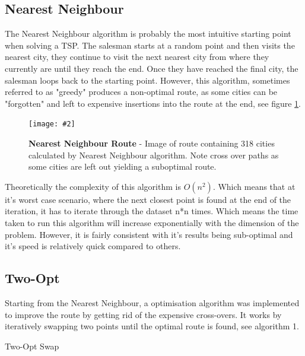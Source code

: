 \documentclass[10pt, a4paper]{article}
\newcommand{\figuremacro}[5]{
    \begin{figure}[#1]
        \centering
        \texttt{[image: \#2]}
        \caption[#3]{\textbf{#3}#4}
        \label{fig:#2}
    \end{figure}
}
\begin{document}
	\subsection{Nearest Neighbour}
	The Nearest Neighbour algorithm is probably the most intuitive starting point when solving a TSP. The salesman starts at a random point and then visits the nearest city, they continue to visit the next nearest city from where they currently are until they reach the end. Once they have reached the final city, the salesman loops back to the starting point. However, this algorithm, sometimes referred to as "greedy" produces a non-optimal route, as some cities can be "forgotten" and left to expensive insertions into the route at the end, see figure \ref{fig:nnroutepath}.
	\figuremacro{h}{nnroutepath}{Nearest Neighbour Route}{ - Image of route containing 318 cities calculated by Nearest Neighbour algorithm. Note cross over paths as some cities are left out yielding a suboptimal route.}{1.0}
	
	Theoretically the complexity of this algorithm is $O(n^2)$. Which means that at it's worst case scenario, where the next closest point is found at the end of the iteration, it has to iterate through the dataset n*n times. Which means the time taken to run this algorithm will increase exponentially with the dimension of the problem. However, it is fairly consistent with it's results being sub-optimal and it's speed is relatively quick compared to others. \cite{nearest}
	
	\subsection{Two-Opt}
	Starting from the Nearest Neighbour, a optimisation algorithm was implemented to improve the route by getting rid of the expensive cross-overs. It works by iteratively swapping two points until the optimal route is found, see algorithm 1.
	
	\begin{algorithm}[h]
		\caption{Two-Opt Swap}
	\end{algorithm}
	
\end{document}
